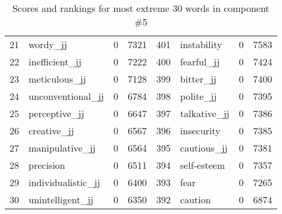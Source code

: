 \begin{table}[tbp]
\begin{tabular}{| rlr@{.}l | rlr@{.}l |}
    21 & wordy\_jj & 0 & 7321    &    401 & instability & 0 & 7583 \\
    22 & inefficient\_jj & 0 & 7222    &    400 & fearful\_jj & 0 & 7424 \\
    23 & meticulous\_jj & 0 & 7128    &    399 & bitter\_jj & 0 & 7400 \\
    24 & unconventional\_jj & 0 & 6784    &    398 & polite\_jj & 0 & 7395 \\
    25 & perceptive\_jj & 0 & 6647    &    397 & talkative\_jj & 0 & 7386 \\
    26 & creative\_jj & 0 & 6567    &    396 & insecurity & 0 & 7385 \\
    27 & manipulative\_jj & 0 & 6564    &    395 & cautious\_jj & 0 & 7381 \\
    28 & precision & 0 & 6511    &    394 & self-esteem & 0 & 7357 \\
    29 & individualistic\_jj & 0 & 6400    &    393 & fear & 0 & 7265 \\
    30 & unintelligent\_jj & 0 & 6350    &    392 & caution & 0 & 6874 \\
    \hline
    \end{tabular}
    \caption{Scores and rankings for most extreme 30 words in component \#5} 
\end{table}
\clearpage
